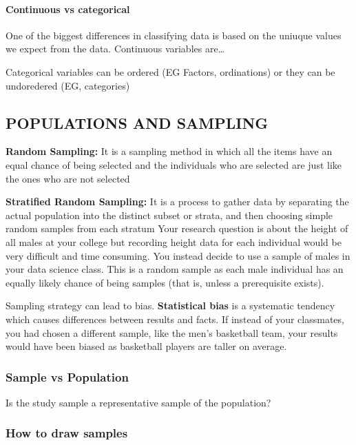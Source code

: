 \documentclass[
]{book}
\begin{document}
\hypertarget{continuous-vs-categorical}{%
\paragraph{Continuous vs categorical}\label{continuous-vs-categorical}}

One of the biggest differences in classifying data is based on the uniuque values we expect from the data. Continuous variables are\ldots{}

Categorical variables can be ordered (EG Factors, ordinations) or they can be undoredered (EG, categories)

\hypertarget{populations-and-sampling}{%
\subsection{POPULATIONS AND SAMPLING}\label{populations-and-sampling}}

\textbf{Random Sampling:} It is a sampling method in which all the items have an equal chance of being selected and the individuals who are selected are just like the ones who are not selected

\textbf{Stratified Random Sampling:} It is a process to gather data by separating the actual population into the distinct subset or strata, and then choosing simple random samples from each stratum Your research question is about the height of all males at your college but recording height data for each individual would be very difficult and time consuming. You instead decide to use a sample of males in your data science class. This is a random sample as each male individual has an equally likely chance of being samples (that is, unless a prerequisite exists).

Sampling strategy can lead to bias. \textbf{Statistical bias} is a systematic tendency which causes differences between results and facts. If instead of your classmates, you had chosen a different sample, like the men's basketball team, your results would have been biased as basketball players are taller on average.

\hypertarget{sample-vs-population}{%
\subsubsection{Sample vs Population}\label{sample-vs-population}}

Is the study sample a representative sample of the population?

\hypertarget{how-to-draw-samples}{%
\subsubsection{How to draw samples}\label{how-to-draw-samples}}
\end{document}
